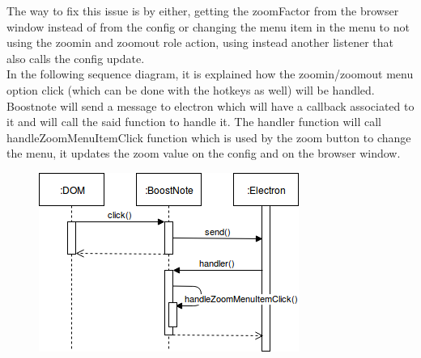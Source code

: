\documentclass[main.tex]{subfiles}
\begin{document}
The way to fix this issue is by either, getting the zoomFactor from the browser window instead of from the config or changing the menu item in the menu to not using the zoomin and zoomout role action, using instead another listener that also calls the config update.\\

In the following sequence diagram, it is explained how the zoomin/zoomout menu option click (which can be done with the hotkeys as well) will be handled. Boostnote will send a message to electron which will have a callback associated to it and will call the said function to handle it. The handler function will call handleZoomMenuItemClick function which is used by the zoom button to change the menu, it updates the zoom value on the config and on the browser window.

\begin{figure}[h]
\includegraphics[scale=0.55]{images/dyagram-2554.png}
\centering
\end{figure}

\nocite{*}
\end{document}

